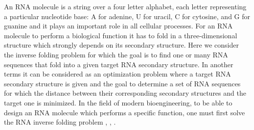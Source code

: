 \documentclass[english,12pt,a4paper]{article}
\theoremstyle{definition}
\begin{document}
An RNA molecule is a string over a four letter alphabet, each letter representing a particular nucleotide base: A for adenine, U for uracil, C for cytosine, and G for guanine and it plays an important role in all cellular processes. For an RNA molecule to perform a biological function it has to fold in a three-dimensional structure which strongly depends on its secondary structure.  Here we consider the inverse folding problem for which the goal is to find one or many RNA sequences that fold into a given target RNA secondary structure. In another terms it can be considered as an optimization problem where a target RNA secondary structure is given and the goal to determine a set of RNA sequences for which the distance between their corresponding secondary structures and the target one is minimized. In the field of modern bioengineering, to be able to design an RNA molecule which performs a specific function, one must first solve the RNA inverse folding problem \cite{goldberg2011nanoparticle}, \cite{hao2014construction}, \cite{win2008higher}.
\end{document}
